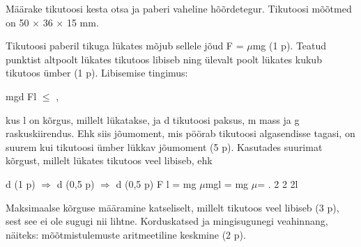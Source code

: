 
Määrake tikutoosi kesta otsa ja paberi vaheline hõõrdetegur. Tikutoosi mõõtmed on 50 $\times$ 36 $\times$ 15 mm.

\hint

\solu
Tikutoosi paberil tikuga lükates mõjub sellele jõud F = $\mu$mg (1 p). Teatud punktist altpoolt lükates tikutoos libiseb ning ülevalt poolt lükates kukub tikutoos ümber (1 p). Libisemise tingimus:

mgd Fl $\leq$ ,

kus l on kõrgus, millelt lükatakse, ja d tikutoosi paksus, m mass ja g raskuskiirendus. Ehk siis jõumoment, mis pöörab tikutoosi algasendisse tagasi, on suurem kui tikutoosi ümber lükkav jõumoment (5 p). Kasutades suurimat kõrgust, millelt lükates tikutoos veel libiseb, ehk

d (1 p) $\Rightarrow$ d (0,5 p) $\Rightarrow$ d (0,5 p) F l = mg $\mu$mgl = mg $\mu$= . 2 2 2l

Maksimaalse kõrguse määramine katseliselt, millelt tikutoos veel libiseb (3 p), sest see ei ole sugugi nii lihtne. Korduskatsed ja mingisugunegi veahinnang, näiteks: mõõtmistulemuste aritmeetiline keskmine (2 p).
\probend
